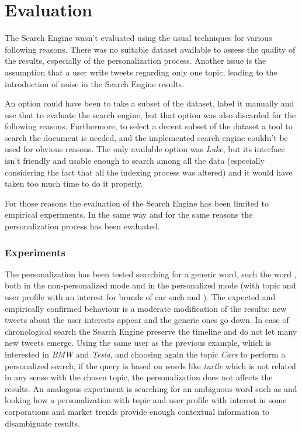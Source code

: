 \section{Evaluation}

The Search Engine wasn't evaluated using the usual techniques for various following reasons. There was no suitable dataset available to assess the quality of the results, especially of the personalization process. Another issue is the assumption that a user write tweets regarding only one topic, leading to the introduction of noise in the Search Engine results.

An option could have been to take a subset of the dataset, label it manually and use that to evaluate the search engine, but that option was also discarded for the following reasons. Furthermore, to select a decent subset of the dataset a tool to search the document is needed, and the implemented search engine couldn't be used for obvious reasons. The only available option was \textit{Luke}, but its interface isn't friendly and usable enough to search among all the data (especially considering the fact that all the indexing process was altered) and it would have taken too much time to do it properly.

For those reasons the evaluation of the Search Engine has been limited to empirical experiments. In the same way and for the same reasons the personalization process has been evaluated.

\subsubsection*{Experiments}

The personalization has been tested searching for a generic word, such the word , both in the non-personalized mode and in the personalized mode (with topic  and user profile with an interest for brands of car such  and ).
The expected and empirically confirmed behaviour is a moderate modification of the results: new tweets about the user interests appear and the generic ones go down.
In case of chronological search the Search Engine preserve the timeline and do not let many new tweets emerge.
Using the same user as the previous example, which is interested in \textit{BMW} and \textit{Tesla}, and choosing again the topic \textit{Cars} to perform a personalized search, if the query is based on words like \textit{turtle} which is not related in any sense with the chosen topic, the personalization does not affects the results.
An analogous experiment is searching for an ambiguous word such as  and looking how a personalization with topic  and user profile with interest in some corporations and market trends provide enough contextual information to disambiguate results. 
